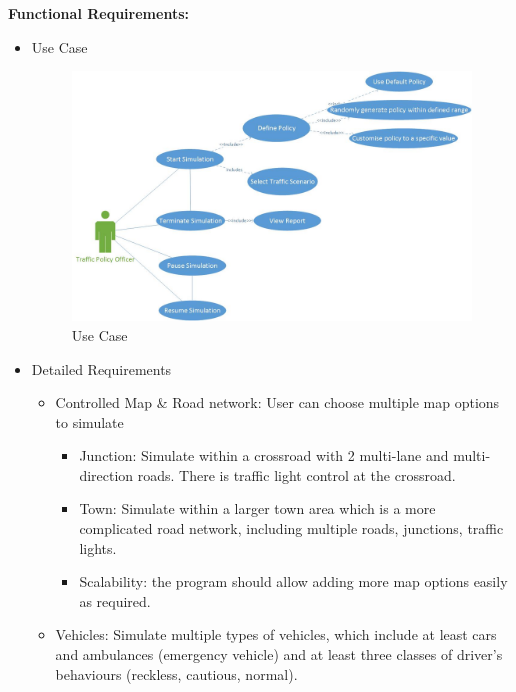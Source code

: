 \documentclass[11pt]{article}
\begin{document}
    {\bf{Functional Requirements:}} \newline
    \begin{itemize}
        \item Use Case
        \begin{figure}[h]
        \includegraphics[width=16cm]{usecase} \caption{Use Case} \label{uc}
        \end{figure}
        \item Detailed Requirements 
        \begin{itemize}
            \item Controlled Map & Road network: User can choose multiple map options to simulate
                 \begin{itemize}[noitemsep]
	                    \item Junction: Simulate within a crossroad with 2 multi-lane and multi-direction roads. There is traffic light control at the crossroad.
	                    \item Town: Simulate within a larger town area which is a more complicated road network, including multiple roads, junctions, traffic lights. 
                    	\item Scalability: the program should allow adding more map options easily as required. 
	
    	\end{itemize}

        \item Vehicles: Simulate multiple types of vehicles, which include at least cars and ambulances (emergency vehicle) and at least three classes of driver’s behaviours (reckless, cautious, normal).


\end{itemize}
\end{itemize}
\end{document}
